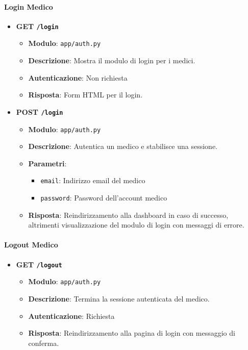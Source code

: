 \documentclass[12pt,a4paper,oneside]{report}
\begin{document}
\paragraph{Login Medico}
\begin{itemize}
    \item \textbf{GET \texttt{/login}}
          \begin{itemize}
              \item \textbf{Modulo}: \texttt{app/auth.py}
              \item \textbf{Descrizione}: Mostra il modulo di login per i medici.
              \item \textbf{Autenticazione}: Non richiesta
              \item \textbf{Risposta}: Form HTML per il login.
          \end{itemize}

    \item \textbf{POST \texttt{/login}}
          \begin{itemize}
              \item \textbf{Modulo}: \texttt{app/auth.py}
              \item \textbf{Descrizione}: Autentica un medico e stabilisce una sessione.
              \item \textbf{Parametri}:
                    \begin{itemize}
                        \item \texttt{email}: Indirizzo email del medico
                        \item \texttt{password}: Password dell'account medico
                    \end{itemize}
              \item \textbf{Risposta}: Reindirizzamento alla dashboard in caso di successo, altrimenti visualizzazione del modulo di login con messaggi di errore.
          \end{itemize}
\end{itemize}

\paragraph{Logout Medico}
\begin{itemize}
    \item \textbf{GET \texttt{/logout}}
          \begin{itemize}
              \item \textbf{Modulo}: \texttt{app/auth.py}
              \item \textbf{Descrizione}: Termina la sessione autenticata del medico.
              \item \textbf{Autenticazione}: Richiesta
              \item \textbf{Risposta}: Reindirizzamento alla pagina di login con messaggio di conferma.
          \end{itemize}
\end{itemize}
\end{document}
